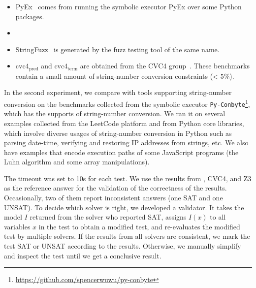 \begin{itemize}
	\item PyEx~\cite{pyex} comes from running the symbolic executor PyEx over some Python packages.
	
	\smallskip
	


	\item {}
	
		\smallskip

	\item StringFuzz~\cite{blotsky2018stringfuzz}  is generated by the fuzz testing tool of the same name.
	
		\smallskip

	\item $\text{cvc4}_{\text{pred}}$ and $\text{cvc4}_{\text{term}}$ are obtained from the CVC4 group~\cite{termEQ}. These benchmarks contain a small amount of string-number conversion constraints (< $5\%$).
\end{itemize}

In the second experiment, we compare with tools supporting string-number conversion on the benchmarks collected from the symbolic executor \texttt{Py-Conbyte}\footnote{\url{https://github.com/spencerwuwu/py-conbyte}}, which has the supports of string-number conversion. We ran it on several examples collected from the LeetCode platform and from Python core libraries, which involve diverse usages of string-number conversion in Python such as parsing date-time, verifying and restoring IP addresses from strings, etc. We also have examples that encode execution paths of some JavaScript programs (the Luhn algorithm and some array manipulations).

	 The timeout was set to 10s for each test.
We use the results from {\tool}, CVC4, and Z3 as the reference answer for the validation of the correctness of the results. Occasionally, two of them report inconsistent  answers (one SAT and one UNSAT). To decide which solver is right, we developed a validator. It takes the model $I$ returned from the solver who reported SAT, assigns $I(x)$ to all variables $x$ in the test to obtain a modified test, and re-evaluates the modified test by multiple solvers. If the results from all solvers are consistent, we mark the test SAT or UNSAT according to the results. Otherwise, we manually simplify and inspect the test until we get a conclusive result. 

